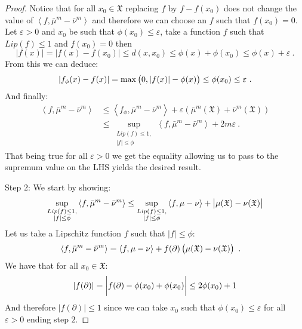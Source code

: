 \documentclass[11pt,a4paper]{article}
\newcommand{\XF}{\mathfrak{X}}
\newcommand{\brac}[1]{\left\langle#1\right\rangle}
\begin{document}
\begin{proof}
    Notice that for all $x_0 \in \XF$ replacing $f$ by $f - f(x_0)$ does not change the value of $\brac{f,\bar{\mu}^m - \bar{\nu}^m}$ and therefore we can choose an $f$ such that $f(x_0) = 0$. Let $\varepsilon > 0$ and $x_0$ be such that $\phi(x_0) \leq \varepsilon$, take a function $f$ such that $Lip(f) \leq 1$ and $f(x_0) = 0$ then 
    \[
    |f(x)| = |f(x) - f(x_0)| \leq d(x,x_0) \leq \phi(x) + \phi(x_0) \leq \phi(x) + \varepsilon\ .
    \]
    From this we can deduce:
    \[
    |f_\phi(x) - f(x)| = \max\left(0,|f(x)| - \phi(x) \vphantom{A^2}\right) \leq \phi(x_0) \leq \varepsilon\ .
    \]
    And finally:
    \begin{align*}
        \brac{f,\bar{\mu}^m - \bar{\nu}^m} &\leq \brac{f_\phi,\bar{\mu}^m - \bar{\nu}^m} + \varepsilon\left(\bar{\mu}^m(\XF) + \bar{\nu}^m(\XF)\right)\\
        &\leq \sup\limits_{\substack{Lip(f) \leq 1,\\ |f| \leq \phi}} \brac{f,\bar{\mu}^m - \bar{\nu}^m} + 2m\varepsilon \ .
    \end{align*}
    That being true for all $\varepsilon > 0$ we get the equality allowing us to pass to the supremum value on the LHS yields the desired result.

    Step $2$: We start by showing:
    \begin{align*}
        \sup\limits_{\substack{Lip(f) \leq 1,\\ |f| \leq \phi}} \brac{f,\bar{\mu}^m - \bar{\nu}^m} \leq \sup\limits_{\substack{Lip(f) \leq 1,\\ |f| \leq \phi}} \brac{f,\mu - \nu} + \left|\vphantom{A^2}\mu(\XF) - \nu(\XF) \right|
    \end{align*}
    Let us take a Lipschitz function $f$ such that $|f| \leq \phi$:
    \begin{align*}
        \brac{f,\bar{\mu}^m - \bar{\nu}^m} &= \brac{f,\mu - \nu} + f(\partial) \left(\mu(\XF) - \nu(\XF)\vphantom{A^2}\right)\ .
    \end{align*}
    We have that for all $x_0 \in \XF$:
    \[
    |f(\partial)| = \left|\vphantom{A^{\int_0}}f(\partial) - \phi(x_0) + \phi(x_0)\right| \leq 2\phi(x_0) + 1
    \]
    And therefore $|f(\partial)| \leq 1$ since we can take $x_0$ such that $\phi(x_0) \leq \varepsilon$ for all $\varepsilon > 0$ ending step $2$.
    

\end{proof}
\end{document}
